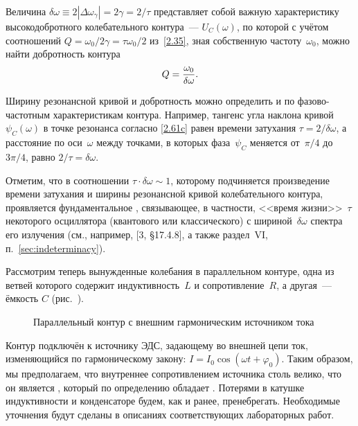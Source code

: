 Величина $\delta\omega\equiv2|\Delta\omega_{\gamma}|=2\gamma=2/\tau$
представляет собой важную характеристику высокодобротного колебательного
контура~---  $U_C(\omega)$, по которой с
учётом соотношений $Q=\omega_0/2\gamma=\tau\omega_0/2$ из~\eqref{2.35}, зная
собственную частоту~$\omega_0$, можно найти добротность контура
\begin{equation}\eqmark{2.63}
Q=\dfrac{\omega_0}{\delta\omega}.
\end{equation}

Ширину резонансной кривой и добротность можно определить и по
фазово-частотным характеристикам контура. Например, тангенс угла наклона
кривой $\psi_C(\omega)$ в точке резонанса согласно \eqref{2.61c} равен времени
затухания $\tau=2/\delta\omega$, а расстояние по оси~$\omega$ между точками, в
которых фаза~$\psi_C$ меняется от~$\pi/4$ до~$3\pi/4$, равно
$2/\tau=\delta\omega$.

Отметим, что в соотношении $\tau\cdot\delta\omega\sim1$, которому
подчиняется произведение времени затухания и ширины резонансной кривой
колебательного контура, проявляется фундаментальное , связывающее, в частности, <<время жизни>>~$\tau$ 
некоторого осциллятора (квантового или классического) с шириной~$\delta\omega$ 
спектра его излучения 
(см., например, [3, \S17.4.8], а также раздел~VI, п.~\ref{sec:indeterminacy}).


\label{sec:ires}

Рассмотрим теперь вынужденные колебания в параллельном контуре, одна из ветвей
которого содержит индуктивность~$L$ и сопротивление~$R$, а другая~--- ёмкость
$C$ (рис.~).

\begin{figure}[h!]
\hspace{1.5cm}
		\caption{Параллельный контур с внешним гармоническим источником тока}
\end{figure}

Контур подключён к источнику ЭДС, задающему во внешней цепи ток, изменяющийся по
гармоническому закону: $I=I_0\cos(\omega t+\varphi_0)$. Таким образом, мы
предполагаем, что внутреннее сопротивлением источника столь велико, что он
является , который по определению обладает
. Потерями в катушке
индуктивности и конденсаторе будем, как и ранее, пренебрегать. Необходимые
уточнения будут сделаны в описаниях соответствующих лабораторных работ.

